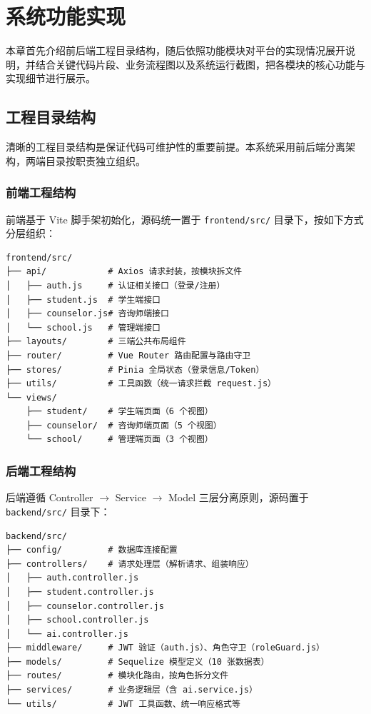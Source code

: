\chapter{系统功能实现}

本章首先介绍前后端工程目录结构，随后依照功能模块对平台的实现情况展开说明，并结合关键代码片段、业务流程图以及系统运行截图，把各模块的核心功能与实现细节进行展示。

\section{工程目录结构}

清晰的工程目录结构是保证代码可维护性的重要前提。本系统采用前后端分离架构，两端目录按职责独立组织。

\subsection{前端工程结构}

前端基于 Vite 脚手架初始化，源码统一置于 \texttt{frontend/src/} 目录下，按如下方式分层组织：

\begin{lstlisting}[numbers=none]
frontend/src/
├── api/            # Axios 请求封装，按模块拆文件
│   ├── auth.js     # 认证相关接口（登录/注册）
│   ├── student.js  # 学生端接口
│   ├── counselor.js# 咨询师端接口
│   └── school.js   # 管理端接口
├── layouts/        # 三端公共布局组件
├── router/         # Vue Router 路由配置与路由守卫
├── stores/         # Pinia 全局状态（登录信息/Token）
├── utils/          # 工具函数（统一请求拦截 request.js）
└── views/
    ├── student/    # 学生端页面（6 个视图）
    ├── counselor/  # 咨询师端页面（5 个视图）
    └── school/     # 管理端页面（3 个视图）
\end{lstlisting}

\subsection{后端工程结构}

后端遵循 Controller $\rightarrow$ Service $\rightarrow$ Model 三层分离原则，源码置于 \texttt{backend/src/} 目录下：

\begin{lstlisting}[numbers=none]
backend/src/
├── config/         # 数据库连接配置
├── controllers/    # 请求处理层（解析请求、组装响应）
│   ├── auth.controller.js
│   ├── student.controller.js
│   ├── counselor.controller.js
│   ├── school.controller.js
│   └── ai.controller.js
├── middleware/     # JWT 验证（auth.js）、角色守卫（roleGuard.js）
├── models/         # Sequelize 模型定义（10 张数据表）
├── routes/         # 模块化路由，按角色拆分文件
├── services/       # 业务逻辑层（含 ai.service.js）
└── utils/          # JWT 工具函数、统一响应格式等
\end{lstlisting}

